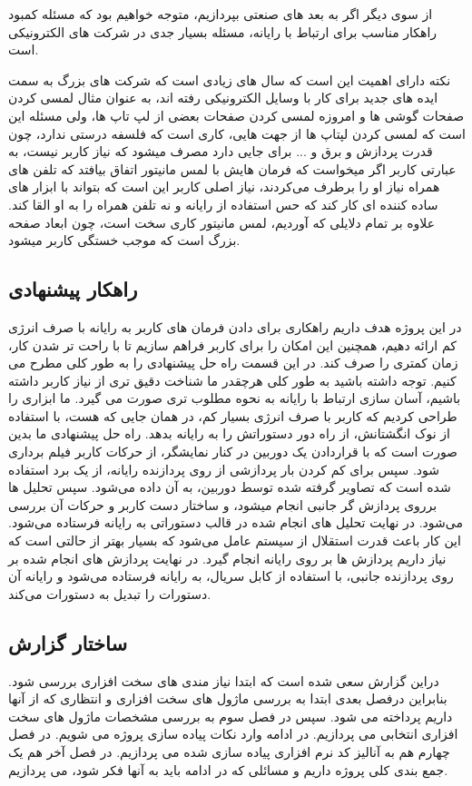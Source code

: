 \documentclass{article}
\begin{document}
از سوی دیگر اگر به بعد های صنعتی بپردازیم، متوجه خواهیم بود که مسئله کمبود راهکار مناسب برای ارتباط با رایانه، مسئله بسیار جدی در شرکت های الکترونیکی است.

نکته دارای اهمیت این است که سال های زیادی است که شرکت های بزرگ به سمت ایده های جدید برای کار با وسایل الکترونیکی رفته اند، به عنوان مثال لمسی کردن صفحات گوشی ها و امروزه لمسی کردن صفحات بعضی از لپ تاپ ها، ولی مسئله این است که لمسی کردن لپتاپ ها از جهت هایی، کاری است که فلسفه درستی ندارد، چون قدرت پردازش و برق و ... برای جایی دارد مصرف میشود که نیاز کاربر نیست، به عبارتی کاربر اگر میخواست که فرمان هایش با لمس مانیتور اتفاق بیافتد که تلفن های همراه نیاز او را برطرف می‌کردند، نیاز اصلی کاربر این است که بتواند با ابزار های ساده کننده ای کار کند که حس استفاده از رایانه و نه تلفن همراه را به او القا کند. علاوه بر تمام دلایلی که آوردیم، لمس مانیتور کاری سخت است، چون ابعاد صفحه بزرگ است که موجب خستگی کاربر میشود.

\subsection{راهکار پیشنهادی}
در این پروژه هدف داریم راهکاری برای دادن فرمان های کاربر به رایانه با صرف انرژی کم ارائه دهیم، همچنین این امکان را برای کاربر فراهم سازیم تا با راحت تر شدن کار، زمان کمتری را صرف کند. در این قسمت راه حل پیشنهادی را به طور کلی مطرح می کنیم. توجه داشته باشید به طور کلی هرچقدر ما شناخت دقیق تری از نیاز کاربر داشته باشیم، آسان سازی ارتباط با رایانه به نحوه مطلوب تری صورت می گیرد. ما ابزاری را طراحی کردیم که کاربر با صرف انرژی بسیار کم، در همان جایی که هست، با استفاده از نوک انگشتانش، از راه دور دستوراتش را به رایانه بدهد. راه حل پیشنهادی ما بدین صورت است که با قراردادن یک دوربین در کنار نمایشگر، از حرکات کاربر فیلم برداری شود. سپس برای کم کردن بار پردازشی از روی پردازنده رایانه، از یک برد  استفاده شده است که تصاویر گرفته شده توسط دوربین، به آن داده می‌شود. سپس تحلیل ها برروی پردازش گر جانبی انجام میشود، و ساختار دست کاربر و حرکات آن بررسی می‌شود. در نهایت تحلیل های انجام شده در قالب دستوراتی به رایانه فرستاده می‌شود. این کار باعث قدرت استقلال از سیستم عامل می‌شود که بسیار بهتر از حالتی است که نیاز داریم پردازش ها بر روی رایانه انجام گیرد.
در نهایت پردازش های انجام شده بر روی پردازنده جانبی، با استفاده از کابل سریال، به رایانه فرستاده می‌شود و رایانه آن دستورات را تبدیل به دستورات  می‌کند.

\subsection{ساختار گزارش}
دراین گزارش سعی شده است که ابتدا نیاز مندی های سخت افزاری بررسی شود. بنابراین درفصل بعدی ابتدا به بررسی ماژول های سخت افزاری و انتظاری که از آنها داریم پرداخته می شود. سپس در فصل سوم به بررسی مشخصات ماژول های سخت افزاری انتخابی می پردازیم. در ادامه وارد نکات پیاده سازی پروژه می شویم. در فصل چهارم هم به آنالیز کد نرم افزاری پیاده سازی شده می پردازیم. در فصل آخر هم یک جمع بندی کلی پروژه داریم و مسائلی که در ادامه باید به آنها فکر شود، می پردازیم.
\end{document}
